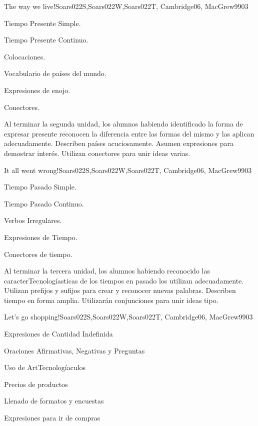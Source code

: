 \begin{syllabus}
\begin{unit}{The way we live!}{Soars022S,Soars022W,Soars022T, Cambridge06, MacGrew99}{0}{3}
   \begin{topics}
      \item Tiempo Presente Simple.
      \item Tiempo Presente Continuo.
      \item Colocaciones.
      \item Vocabulario de países del  mundo.
      \item Expresiones de enojo.
      \item Conectores.
   \end{topics}

   \begin{unitgoals}
      \item Al terminar la segunda unidad, los alumnos habiendo identificado la forma de expresar presente reconocen la diferencia entre las formas del mismo y las aplican adecuadamente. Describen países acuciosamente.  Asumen expresiones para demostrar interés. Utilizan conectores para unir ideas varias.  
   \end{unitgoals}
\end{unit}

\begin{unit}{It all went wrong!}{Soars022S,Soars022W,Soars022T, Cambridge06, MacGrew99}{0}{3}
   \begin{topics}
      \item Tiempo Pasado Simple.
      \item Tiempo Pasado Continuo.
      \item Verbos Irregulares.
      \item Expresiones de Tiempo.
      \item Conectores de tiempo.
   \end{topics}

   \begin{unitgoals}
      \item Al terminar la tercera unidad, los alumnos habiendo reconocido las caracterTecnologíasticas de los tiempos en pasado los utilizan adecuadamente. Utilizan prefijos y sufijos para crear y reconocer nuevas palabras. Describen tiempo en forma amplia. Utilizarán conjunciones para unir ideas tipo. 
   \end{unitgoals}
\end{unit}

\begin{unit}{Let's go shopping!}{Soars022S,Soars022W,Soars022T, Cambridge06, MacGrew99}{0}{3}
   \begin{topics}
      \item Expresiones de Cantidad Indefinida
      \item Oraciones Afirmativas, Negativas y Preguntas
      \item Uso de ArtTecnologíaculos
      \item Precios de productos
      \item Llenado de formatos y encuestas
      \item Expresiones para ir de compras
   \end{topics}


\end{unit}
\end{syllabus}
